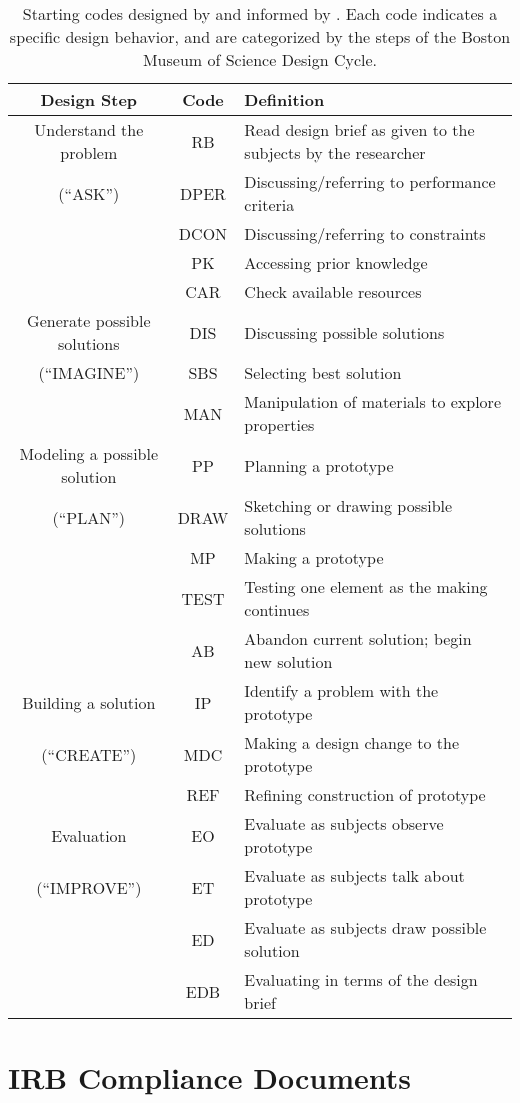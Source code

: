 %
\begin{table}
\begin{centering}
\begin{tabular}{|c|c| p{2.5in} |}
\hline 
Design Step & Code & Definition\tabularnewline
\hline
Understand the problem & RB & Read design brief as given to the subjects by the researcher\tabularnewline
\cline{2-3} 
({}``ASK'') & DPER & Discussing/referring to performance criteria\tabularnewline
\cline{2-3} 
 & DCON & Discussing/referring to constraints\tabularnewline
\cline{2-3} 
 & PK & Accessing prior knowledge\tabularnewline
\cline{2-3} 
 & CAR & Check available resources\tabularnewline
\hline 
Generate possible solutions & DIS & Discussing possible solutions\tabularnewline
\cline{2-3} 
({}``IMAGINE'') & SBS & Selecting best solution\tabularnewline
\cline{2-3} 
 & MAN & Manipulation of materials to explore properties\tabularnewline
\hline
Modeling a possible solution & PP & Planning a prototype\tabularnewline
\cline{2-3} 
({}``PLAN'') & DRAW & Sketching or drawing possible solutions\tabularnewline
\cline{2-3} 
 & MP & Making a prototype\tabularnewline
\cline{2-3} 
 & TEST & Testing one element as the making continues\tabularnewline
\cline{2-3} 
 & AB & Abandon current solution; begin new solution\tabularnewline
\hline 
Building a solution & IP & Identify a problem with the prototype\tabularnewline
\cline{2-3} 
({}``CREATE'') & MDC & Making a design change to the prototype\tabularnewline
\cline{2-3} 
 & REF & Refining construction of prototype\tabularnewline
\hline 
Evaluation & EO & Evaluate as subjects observe prototype\tabularnewline
\cline{2-3} 
({}``IMPROVE'') & ET & Evaluate as subjects talk about prototype\tabularnewline
\cline{2-3} 
 & ED & Evaluate as subjects draw possible solution\tabularnewline
\cline{2-3} 
 & EDB & Evaluating in terms of the design brief\tabularnewline
\hline
\end{tabular}
\par

\end{centering} 

\caption[Starting codes.]{Starting codes designed by \citet{REESE} and informed by \citet{welch}. Each code indicates a specific design behavior, and are categorized by the steps of the Boston Museum of Science Design Cycle.}

\label{tab:starting-codes}

\end{table}

\chapter{IRB Compliance Documents}


